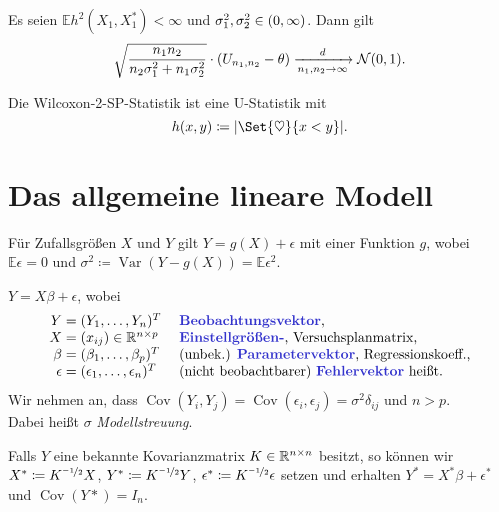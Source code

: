 \documentclass{cheat-sheet}
\newcommand{\E}{\mathbb{E}} %
\DeclareMathOperator{\var}{Var} %
\DeclareMathOperator{\cov}{Cov} %
\newcommand{\Normal}{\mathcal{N}} %
\begin{document}
\begin{lem}
  Es seien $\E h^2(X_1, X_1^*) < \infty$ und $\sigma_1^2, \sigma_2^2 \in \left( 0, \infty \right)$.
  Dann gilt
  \[
    \sqrt{\frac{n_1 n_2}{n_2 \sigma_1^2 + n_1 \sigma_2^2}} \cdot
    (U_{n_1, n_2} - \theta) \xra[n_1, n_2 \to \infty]{d} \Normal(0, 1).
  \]
\end{lem}

\begin{bsp}
  Die Wilcoxon-2-SP-Statistik ist eine U-Statistik mit
  \[ h(x, y) \coloneqq \abs{\Set{\heartsuit}{x < y}}. \]
\end{bsp}

\section{Das allgemeine lineare Modell}

\begin{modell}[allgemein]
  Für Zufallsgrößen $X$ und $Y$ gilt $Y = g(X) + \epsilon$ mit einer Funktion $g$, wobei $\E \epsilon = 0$ und $\sigma^2 \coloneqq \var (Y - g(X)) = \E \epsilon^2$.
\end{modell}

\begin{modell}
  $Y = X \beta + \epsilon$, wobei
  \[
    \arraycolsep=1.4pt
    \begin{array}{r c l l}
      Y &=& (Y_1, \ldots, Y_n)^T \quad & \text{\emph{Beobachtungsvektor},} \\
      X &=& (x_{ij}) \in \R^{n \times p} & \text{\emph{Einstellgrößen-}, Versuchsplanmatrix,} \\
      \beta &=& (\beta_1, \ldots, \beta_p)^T & \text{(unbek.) \emph{Parametervektor}, Regressionskoeff.,} \\
      \epsilon &=& (\epsilon_1, \ldots, \epsilon_n)^T & \text{(nicht beobachtbarer) \emph{Fehlervektor} heißt.}
    \end{array}
  \]
  Wir nehmen an, dass $\cov(Y_i, Y_j) = \cov(\epsilon_i, \epsilon_j) = \sigma^2 \delta_{ij}$ und $n > p$. \\
  Dabei heißt $\sigma$ \emph{Modellstreuung}.
\end{modell}


\begin{bem}
  Falls $Y$ eine bekannte Kovarianzmatrix $K \in \mathbb{R}^{n \times n}$ besitzt, so können wir $X^* \coloneqq K^{\nicefrac{-1}{2}} X$, $Y^* \coloneqq K^{\nicefrac{-1}{2}} Y$, $\epsilon^* \coloneqq K^{\nicefrac{-1}{2}} \epsilon$ setzen und erhalten $Y^* = X^* \beta + \epsilon^*$ und $\cov(Y*) = I_n$.
\end{bem}
\end{document}
